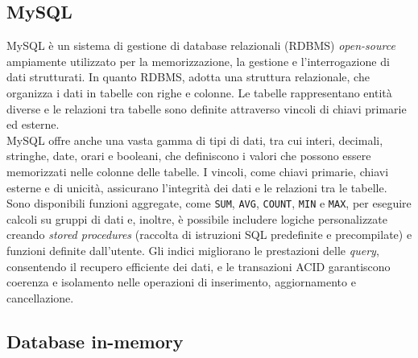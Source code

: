 \subsection{MySQL}

MySQL è un sistema di gestione di database relazionali (RDBMS) \textit{open-source} ampiamente utilizzato per la memorizzazione, la gestione e l’interrogazione di dati strutturati. In quanto RDBMS, adotta una struttura relazionale, che organizza i dati in tabelle con righe e colonne. Le tabelle rappresentano entità diverse e le relazioni tra tabelle sono definite attraverso vincoli di chiavi primarie ed esterne.\cite{DATABASE_html}\\
MySQL offre anche una vasta gamma di tipi di dati, tra cui interi, decimali, stringhe, date, orari e booleani, che definiscono i valori che possono essere memorizzati nelle colonne delle tabelle. I vincoli, come chiavi primarie, chiavi esterne e di unicità, assicurano l'integrità dei dati e le relazioni tra le tabelle. Sono disponibili funzioni aggregate, come \texttt{SUM}, \texttt{AVG}, \texttt{COUNT}, \texttt{MIN} e \texttt{MAX}, per eseguire calcoli su gruppi di dati e, inoltre, è possibile includere logiche personalizzate creando \textit{stored procedures} (raccolta di istruzioni SQL predefinite e precompilate) e funzioni definite dall'utente. Gli indici migliorano le prestazioni delle \textit{query}, consentendo il recupero efficiente dei dati, e le transazioni ACID garantiscono coerenza e isolamento nelle operazioni di inserimento, aggiornamento e cancellazione.

\subsection{Database in-memory}

